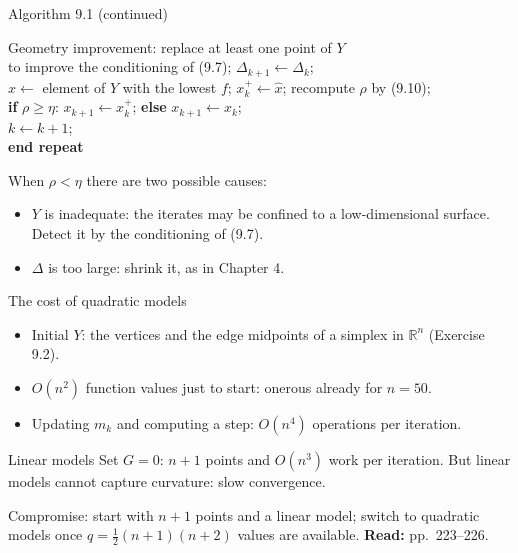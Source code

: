 \documentclass[12pt,aspectratio=169]{beamer}
\newcommand{\readpp}[1]{{\color{red!80!black}\textbf{Read:} #1}}
\newcommand{\R}{\mathbb{R}}
\newcommand{\algblock}[1]{\begin{block}{}#1\end{block}}
\newcommand{\kw}[1]{\textbf{#1}}
\newcommand{\ind}{\hspace*{1.2em}}
\begin{document}
\begin{frame}{Algorithm 9.1 (continued)}
  \algblock{
    \ind Geometry improvement: replace at least one point of $Y$ \\
    \ind\ind to improve the conditioning of (9.7); $\Delta_{k+1}\leftarrow\Delta_k$;\\
    \ind $\hat x\leftarrow$ element of $Y$ with the lowest $f$; $x_k^+\leftarrow\hat x$; recompute $\rho$ by (9.10);\\
    \ind \kw{if} $\rho\ge\eta$: $x_{k+1}\leftarrow x_k^+$; \kw{else} $x_{k+1}\leftarrow x_k$;\\
    \ind $k\leftarrow k+1$;\\
    \kw{end repeat}
  }
  When $\rho<\eta$ there are two possible causes:
  \begin{itemize}
    \item $Y$ is inadequate: the iterates may be confined to a low-dimensional surface.
      Detect it by the \alert{conditioning of (9.7)}.
    \item $\Delta$ is too large: shrink it, as in Chapter 4.
  \end{itemize}
\end{frame}

\begin{frame}{The cost of quadratic models}
  \begin{itemize}
    \item Initial $Y$: the vertices and the edge midpoints of a simplex in $\R^n$ (Exercise 9.2).
    \item $O(n^2)$ function values just to start: onerous already for $n=50$.
    \item Updating $m_k$ and computing a step: $O(n^4)$ operations per iteration.
  \end{itemize}
  \begin{block}{Linear models}
    Set $G=0$: $n+1$ points and $O(n^3)$ work per iteration.
    But linear models cannot capture curvature: \alert{slow convergence}.
  \end{block}
  Compromise: start with $n+1$ points and a linear model; switch to quadratic models
  once $q=\tfrac12(n+1)(n+2)$ values are available.
  \readpp{pp.~223--226.}
\end{frame}
\end{document}

